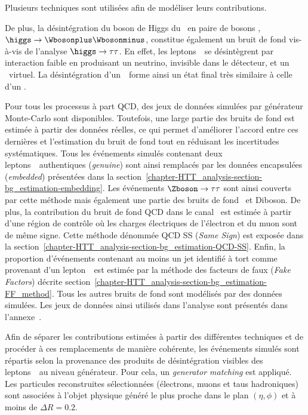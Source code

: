 Plusieurs techniques sont utilisées afin de modéliser leurs contributions.
\par
De plus, la désintégration du boson de Higgs du \SM\ en paire de bosons \Wboson, $\higgs\to\Wbosonplus\Wbosonminus$, constitue également un bruit de fond vis-à-vis de l'analyse $\higgs\to\tau\tau$.
En effet, les leptons~\tau\ se désintègrent par interaction faible en produisant un neutrino, invisible dans le détecteur, et un \Wboson\ virtuel.
La désintégration d'un~\tau\ forme ainsi un état final très similaire à celle d'un \Wboson.
\par
Pour tous les processus à part QCD, des jeux de données simulées par générateur Monte-Carlo sont disponibles.
Toutefois, une large partie des bruits de fond est estimée à partir des données réelles,
ce qui permet d'améliorer l'accord entre ces dernières et l'estimation du bruit de fond tout en réduisant les incertitudes systématiques.
Tous les événements simulés contenant deux leptons~\tau\ authentiques (\emph{genuine}) sont ainsi remplacés par les données encapsulées (\emph{embedded}) présentées dans la section~\ref{chapter-HTT_analysis-section-bg_estimation-embedding}.
Les événements $\Zboson\to\tau\tau$ sont ainsi couverts par cette méthode mais également une partie des bruits de fond \ttbar\ et Diboson.
De plus, la contribution du bruit de fond QCD dans le canal \ele\mu\ est estimée à partir d'une région de contrôle où les charges électriques de l'électron et du muon sont de même signe.
Cette méthode dénommée \og QCD SS \fg{} (\emph{Same Sign}) est exposée dans la section~\ref{chapter-HTT_analysis-section-bg_estimation-QCD-SS}.
Enfin, la proportion d'événements contenant au moins un jet identifié à tort comme provenant d'un lepton~\tau\ est estimée par la méthode des facteurs de faux (\emph{Fake Factors}) décrite section~\ref{chapter-HTT_analysis-section-bg_estimation-FF_method}.
Tous les autres bruits de fond sont modélisés par des données simulées.
Les jeux de données ainsi utilisés dans l'analyse sont présentés dans l'annexe~.
\par
Afin de séparer les contributions estimées à partir des différentes techniques et de procéder à ces remplacements de manière cohérente, les événements simulés sont répartis selon la provenance des produits de désintégration visibles des leptons~\tau\ au niveau générateur.
Pour cela, un \emph{generator matching} est appliqué.
Les particules reconstruites sélectionnées (électrons, muons et taus hadroniques) sont associées à l'objet physique généré le plus proche dans le plan $(\eta, \phi)$ et à moins de $\Delta R = \num{0.2}$.
